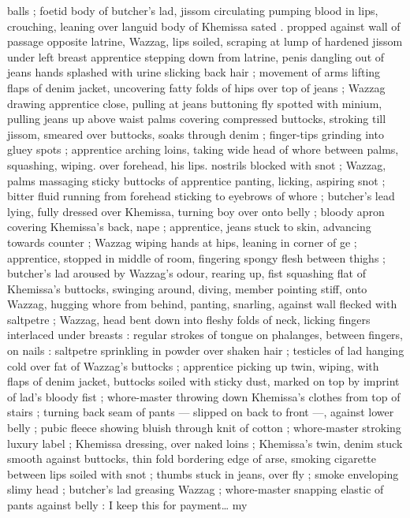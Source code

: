 {balls ; foetid body of butcher's lad, jissom circulating pumping blood 
in lips, crouching, leaning over languid body of Khemissa sated . 
propped against wall of passage opposite latrine, Wazzag, lips 
soiled, scraping at lump of hardened jissom under left breast 
apprentice stepping down from latrine, penis dangling out of jeans 
hands splashed with urine slicking back hair ; movement of arms 
lifting flaps of denim jacket, uncovering fatty folds of hips over top 
of jeans ; Wazzag drawing apprentice close, pulling at jeans 
buttoning fly spotted with minium, pulling jeans up above waist 
palms covering compressed buttocks, stroking till jissom, smeared 
over buttocks, soaks through denim ; finger-tips grinding into gluey 
spots ; apprentice arching loins, taking wide head of whore between 
palms, squashing, wiping. over forehead, his lips. nostrils blocked 
with snot ; Wazzag, palms massaging sticky buttocks of apprentice 
panting, licking, aspiring snot ; bitter fluid running from forehead 
sticking to eyebrows of whore ; butcher's lead lying, fully dressed 
over Khemissa, turning boy over onto belly ; bloody apron covering 
Khemissa's back, nape ; apprentice, jeans stuck to skin, advancing 
towards counter ; Wazzag wiping hands at hips, leaning in corner of 
ge ; apprentice, stopped in middle of room, fingering spongy 
flesh between thighs ; butcher's lad aroused by Wazzag's odour, 
rearing up, fist squashing flat of Khemissa's buttocks, swinging 
around, diving, member pointing stiff, onto Wazzag, hugging whore 
from behind, panting, snarling, against wall flecked with saltpetre ; 
Wazzag, head bent down into fleshy folds of neck, licking fingers 
interlaced under breasts : regular strokes of tongue on phalanges, 
between fingers, on nails : saltpetre sprinkling in powder over shaken 
hair ; testicles of lad hanging cold over fat of Wazzag's buttocks ; 
apprentice picking up twin, wiping, with flaps of denim jacket, 
buttocks soiled with sticky dust, marked on top by imprint of lad's 
bloody fist ; whore-master throwing down Khemissa's clothes from 
top of stairs ; turning back seam of pants --- slipped on back to front 
---, against lower belly ; pubic fleece showing bluish through knit of 
cotton ; whore-master stroking luxury label ; Khemissa dressing, over 
naked loins ; Khemissa's twin, denim stuck smooth against buttocks, 
thin fold bordering edge of arse, smoking cigarette between lips 
soiled with snot ; thumbs stuck in jeans, over fly ; smoke enveloping 
slimy head ; butcher's lad greasing Wazzag ; whore-master snapping 
elastic of pants against belly : {\gl}{\td} I keep this for payment{\ldots} my 
}
